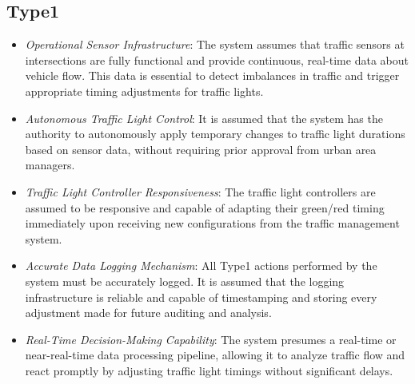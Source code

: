 \documentclass[a4paper,12pt]{article}
\begin{document}
\subsection*{Type1}
\begin{itemize}
    \item \textit{Operational Sensor Infrastructure}: The system assumes that traffic sensors at intersections are fully functional and provide continuous, real-time data about vehicle flow. This data is essential to detect imbalances in traffic and trigger appropriate timing adjustments for traffic lights.
    
    \item \textit{Autonomous Traffic Light Control}: It is assumed that the system has the authority to autonomously apply temporary changes to traffic light durations based on sensor data, without requiring prior approval from urban area managers.

    \item \textit{Traffic Light Controller Responsiveness}: The traffic light controllers are assumed to be responsive and capable of adapting their green/red timing immediately upon receiving new configurations from the traffic management system.

    \item \textit{Accurate Data Logging Mechanism}: All Type1 actions performed by the system must be accurately logged. It is assumed that the logging infrastructure is reliable and capable of timestamping and storing every adjustment made for future auditing and analysis.

    \item \textit{Real-Time Decision-Making Capability}: The system presumes a real-time or near-real-time data processing pipeline, allowing it to analyze traffic flow and react promptly by adjusting traffic light timings without significant delays.
\end{itemize}
\end{document}

